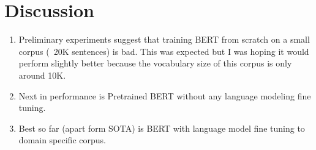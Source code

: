 \section{Discussion}
\label{sec:discussion}

\begin{enumerate}
	\item Preliminary experiments suggest that training BERT from scratch on a small corpus (~20K sentences) is bad. This was expected but I was hoping it would perform slightly better because the vocabulary size of this corpus is only around 10K.
	\item Next in performance is Pretrained BERT without any language modeling fine tuning. 
	\item Best so far (apart form SOTA) is BERT with language model fine tuning to domain specific corpus.
\end{enumerate}